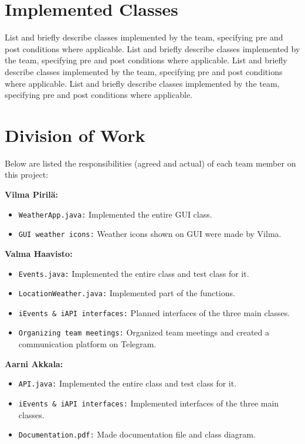 \documentclass[a4paper,12pt]{article}
\begin{document}
\section{Implemented Classes}

List and briefly describe classes implemented by the team, specifying pre and post conditions where applicable.
List and briefly describe classes implemented by the team, specifying pre and post conditions where applicable.
List and briefly describe classes implemented by the team, specifying pre and post conditions where applicable.
List and briefly describe classes implemented by the team, specifying pre and post conditions where applicable.


\section{Division of Work}

Below are listed the responsibilities (agreed and actual) of each team member on this project:

\textbf{Vilma Pirilä:}
\begin{itemize}
    \item \texttt{WeatherApp.java:} Implemented the entire GUI class.
    \item \texttt{GUI weather icons:} Weather icons shown on GUI were made by Vilma.
\end{itemize}

\textbf{Valma Haavisto:}
\begin{itemize}
    \item \texttt{Events.java:} Implemented the entire class and test class for it.
    \item \texttt{LocationWeather.java:} Implemented part of the functions.
    \item \texttt{iEvents \& iAPI interfaces:} Planned interfaces of the three main classes.
    \item \texttt{Organizing team meetings:} Organized team meetings and created a communication platform on Telegram.
\end{itemize}

\textbf{Aarni Akkala:}
\begin{itemize}
    \item \texttt{API.java:} Implemented the entire class and test class for it.
    \item \texttt{iEvents \& iAPI interfaces:} Implemented interfaces of the three main classes.
    \item \texttt{Documentation.pdf:} Made documentation file and class diagram.
\end{itemize}
\end{document}
